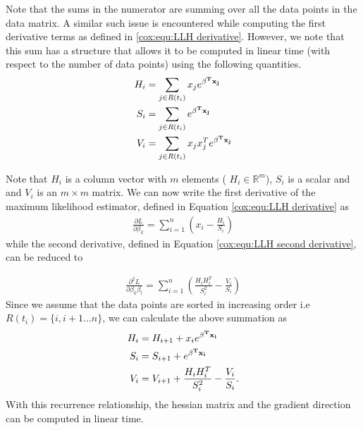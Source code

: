 Note that the sums in the numerator are summing over all the data points in the
data matrix. A similar such issue is encountered while computing the first
derivative terms as defined in \ref{cox:equ:LLH derivative}. However, we note
that this sum has a structure that allows it to be computed in linear time (with
respect to the number of data points) using the following quantities.
\begin{align}
H_{i} &=   \sum_{j \in R(t_i)} x_{j} e^{\bold{\beta^T x_j}}\\
S_{i}&=   \sum_{j \in R(t_i)} e^{\bold{\beta^T x_j}} \\
V_{i}&=   \sum_{j \in R(t_i)} x_{j}x_{j}^T e^{\bold{\beta^T x_j} }
\end{align}

Note that $H_{i}$ is a column vector with $m$ elements ( $H_{i}\in
\mathbb{R}^m$), $S_{i}$ is a scalar and and $V_{i}$ is an $m \times m$ matrix.
We can now write the first derivative of the maximum likelihood estimator,
defined in Equation \ref{cox:equ:LLH derivative} as
\begin{align}
\frac{\partial L}{\partial \beta_k} = \sum_{i = 1}^n \left( x_{i} - \frac{H_{i} }{ S_{i}}  \right)
\end{align}
while the second derivative, defined in Equation \ref{cox:equ:LLH second
derivative}, can be reduced to

\begin{align}
\frac{\partial^2 L}{\partial \beta_k \beta_l} = \sum_{i = 1}^n \left( \frac{H_{i}H_{i}^T }{ S_{i}^2 } -  \frac{V_{i}}{ S_{i} } \right)
\end{align}
Since we assume that the data points are sorted in increasing order i.e
$R(t_i) = \{i, i+1 \ldots n \}$, we can calculate the above summation as
\begin{align}
H_{i}& =   H_{i+1} +  x_{i} e^{\bold{\beta^T x_i}} \label{eq:numerator_avg}\\
S_i & = S_{i+1} + e^{\bold{\beta^T x_i}} \label{eq:denominator_avg}\\
V_i & = V_{i+1} +  \frac{H_{i}H_{i}^T }{ S_{i}^2 } -  \frac{V_{i}}{
  S_{i}} \label{eq:hessian}.
\end{align}
With this recurrence relationship, the hessian matrix and the gradient direction
can be computed in linear time.



